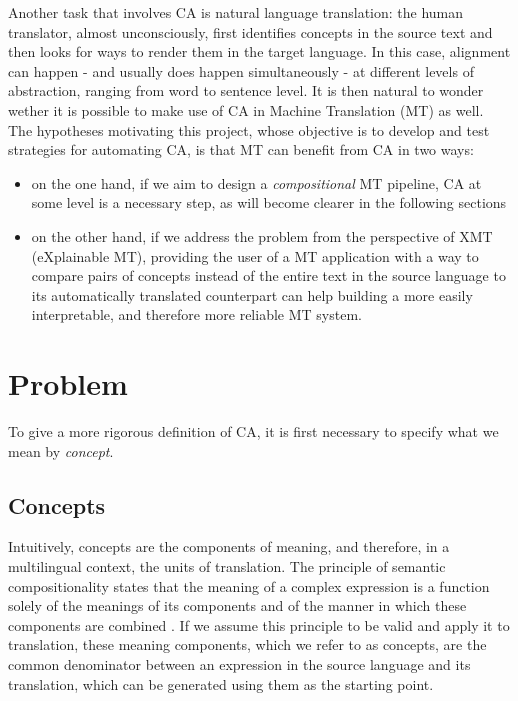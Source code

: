\documentclass{article}
\begin{document}
Another task that involves CA is natural language translation: the human translator, almost unconsciously, first identifies concepts in the source text and then looks for ways to render them in the target language. In this case, alignment can happen - and usually does happen simultaneously - at different levels of abstraction, ranging from word to sentence level.
It is then natural to wonder wether it is possible to make use of CA in Machine Translation (MT) as well. The hypotheses motivating this project, whose objective is to develop and test strategies for automating CA, is that MT can benefit from CA in two ways: %
\begin{itemize}
    \item on the one hand, if we aim to design a \textit{compositional} MT pipeline, CA at some level is a necessary step, as will become clearer in the following sections
    \item on the other hand, if we address the problem from the perspective of XMT (eXplainable MT), providing the user of a MT application with a way to compare pairs of concepts instead of the entire text in the source language to its automatically translated counterpart can help building a more easily interpretable, and therefore more reliable MT system.
\end{itemize}


\section{Problem} 
To give a more rigorous definition of CA, it is first necessary to specify what we mean by \textit{concept}. 

\subsection{Concepts} \label{concepts}
Intuitively, concepts are the components of meaning, and therefore, in a multilingual context, the units of translation. The principle of semantic compositionality states that the meaning of a complex expression is a function solely of the meanings of its components and of the manner in which these components are combined \cite{frege}.
If we assume this principle to be valid and apply it to translation, these meaning components, which we refer to as concepts, are the common denominator between an expression in the source language and its translation, which can be generated using them as the starting point.
\end{document}
